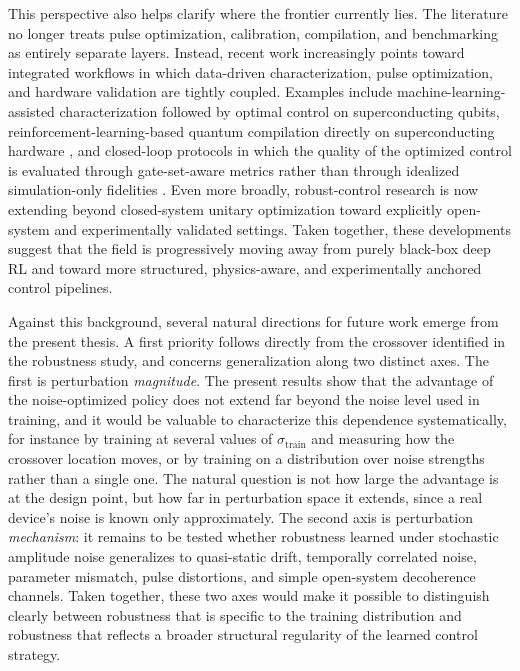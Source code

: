This perspective also helps clarify where the frontier currently lies. The literature no longer treats pulse optimization, calibration, compilation, and benchmarking as entirely separate layers. Instead, recent work increasingly points toward integrated workflows in which data-driven characterization, pulse optimization, and hardware validation are tightly coupled. Examples include machine-learning-assisted characterization followed by optimal control on superconducting qubits, reinforcement-learning-based quantum compilation directly on superconducting hardware \cite{Wang2024}, and closed-loop protocols in which the quality of the optimized control is evaluated through gate-set-aware metrics rather than through idealized simulation-only fidelities \cite{Vetter2024,Glaser2025}. Even more broadly, robust-control research is now extending beyond closed-system unitary optimization toward explicitly open-system and experimentally validated settings. Taken together, these developments suggest that the field is progressively moving away from purely black-box deep RL and toward more structured, physics-aware, and experimentally anchored control pipelines.

Against this background, several natural directions for future work emerge from the present thesis. A first priority follows directly from the crossover identified in the robustness study, and concerns generalization along two distinct axes. The first is perturbation \emph{magnitude}. The present results show that the advantage of the noise-optimized policy does not extend far beyond the noise level used in training, and it would be valuable to characterize this dependence systematically, for instance by training at several values of \(\sigma_{\mathrm{train}}\) and measuring how the crossover location moves, or by training on a distribution over noise strengths rather than a single one. The natural question is not how large the advantage is at the design point, but how far in perturbation space it extends, since a real device's noise is known only approximately. The second axis is perturbation \emph{mechanism}: it remains to be tested whether robustness learned under stochastic amplitude noise generalizes to quasi-static drift, temporally correlated noise, parameter mismatch, pulse distortions, and simple open-system decoherence channels. Taken together, these two axes would make it possible to distinguish clearly between robustness that is specific to the training distribution and robustness that reflects a broader structural regularity of the learned control strategy.

